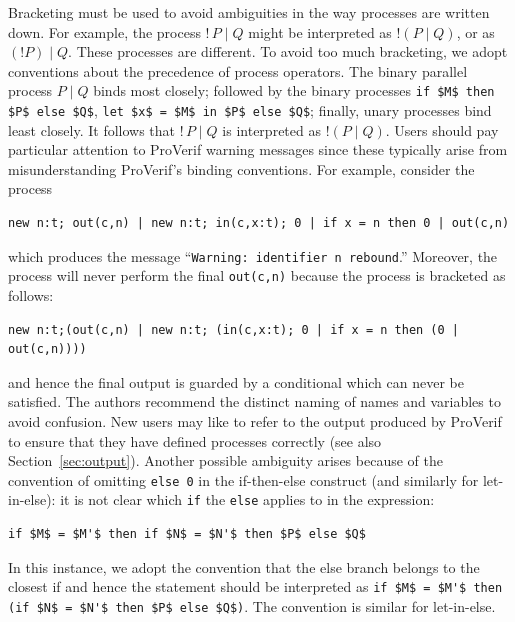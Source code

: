 \documentclass{book}
\begin{document}
Bracketing must be used to avoid ambiguities in the way processes are written down. For example, the process $!\,P\mid Q$ might be interpreted as $!(P\mid Q)$, or as $(!P)\mid Q$. These processes are different. To avoid too much bracketing, we adopt conventions about the precedence of process operators. The binary parallel process $P \mid Q$ binds most closely; followed by the binary processes \lstinline!if $M$ then $P$ else $Q$!, \lstinline!let $x$ = $M$ in $P$ else $Q$!; finally, unary processes bind least closely. It follows that $!\,P\mid Q$ is interpreted as $!(P\mid Q)$. Users should pay particular attention to ProVerif warning messages since these typically arise from misunderstanding ProVerif's binding conventions. For example, consider the process
%
\begin{lstlisting}[numbers=none]
new n:t; out(c,n) | new n:t; in(c,x:t); 0 | if x = n then 0 | out(c,n)
\end{lstlisting}
%
which produces the message ``\lstinline!Warning: identifier n rebound!.'' Moreover, the process will never perform the final \lstinline!out(c,n)! because the process is bracketed as follows:
%
\begin{lstlisting}[numbers=none]
new n:t;(out(c,n) | new n:t; (in(c,x:t); 0 | if x = n then (0 | out(c,n))))
\end{lstlisting}
%
and hence the final output is guarded by a conditional which can never be satisfied. The authors recommend the distinct naming of names and variables to avoid confusion. New users may like to refer to the output produced by ProVerif to ensure that they have defined processes correctly (see also Section~\ref{sec:output}). Another possible ambiguity arises because of the convention of omitting \lstinline!else 0! in the if-then-else construct (and similarly for let-in-else): it is not clear which \lstinline!if! the \lstinline!else! applies to in the expression:
%
\begin{lstlisting}[numbers=none]
if $M$ = $M'$ then if $N$ = $N'$ then $P$ else $Q$
\end{lstlisting}
%
In this instance, we adopt the convention that the else branch belongs to the closest if and hence the statement should be interpreted as \lstinline!if $M$ = $M'$ then (if $N$ = $N'$ then $P$ else $Q$)!. The convention is similar for let-in-else.

\end{document}
